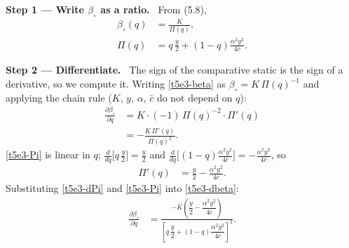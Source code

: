 \documentclass[11pt,a4paper]{article}
\newcommand{\step}[2]{\par\medskip\noindent\textbf{Step #1 --- #2.}~}
\begin{document}
\step{1}{Write $\beta_\circ$ as a ratio} From (5.8),
\begin{align}
  \beta_\circ(q) &= \frac{K}{\Pi(q)}, \label{t5e3-beta}\\
  \Pi(q) &= q\,\frac{y}{2}+(1-q)\frac{\alpha^2y^2}{4\bar c}. \label{t5e3-Pi}
\end{align}

\step{2}{Differentiate} The sign of the comparative static is the sign of a derivative, so we compute
it. Writing \eqref{t5e3-beta} as $\beta_\circ=K\,\Pi(q)^{-1}$ and applying the chain rule ($K$, $y$,
$\alpha$, $\bar c$ do not depend on $q$):
\begin{align}
  \frac{\partial\beta_\circ}{\partial q} &= K\cdot(-1)\,\Pi(q)^{-2}\cdot\Pi'(q) \nonumber\\
  &= -\frac{K\,\Pi'(q)}{\Pi(q)^2}. \label{t5e3-dbeta}
\end{align}
\eqref{t5e3-Pi} is linear in $q$; $\frac{d}{dq}\bigl[q\,\tfrac y2\bigr]=\tfrac y2$ and
$\frac{d}{dq}\bigl[(1-q)\tfrac{\alpha^2y^2}{4\bar c}\bigr]=-\tfrac{\alpha^2y^2}{4\bar c}$, so
\begin{align}
  \Pi'(q) &= \frac{y}{2}-\frac{\alpha^2y^2}{4\bar c}. \label{t5e3-dPi}
\end{align}
Substituting \eqref{t5e3-dPi} and \eqref{t5e3-Pi} into \eqref{t5e3-dbeta}:
\begin{align}
  \frac{\partial\beta_\circ}{\partial q} &= \frac{-K\left(\dfrac{y}{2}-\dfrac{\alpha^2y^2}{4\bar c}\right)}{\left[q\,\dfrac{y}{2}+(1-q)\dfrac{\alpha^2y^2}{4\bar c}\right]^2}. \label{t5e3-final}
\end{align}
\end{document}
